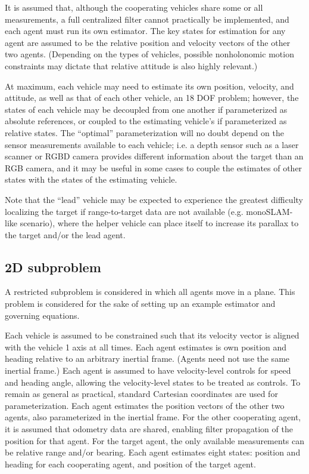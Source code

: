 \documentclass{aiaa-tc}
\begin{document}
It is assumed that, although the cooperating vehicles share some or all measurements, a full centralized filter cannot practically be implemented, and each agent must run its own estimator. The key states for estimation for any agent are assumed to be the relative position and velocity vectors of the other two agents. (Depending on the types of vehicles, possible nonholonomic motion constraints may dictate that relative attitude is also highly relevant.) 

At maximum, each vehicle may need to estimate its own position, velocity, and attitude, as well as that of each other vehicle, an 18 DOF problem; however, the states of each vehicle may be decoupled from one another if parameterized as absolute references, or coupled to the estimating vehicle's if parameterized as relative states. The ``optimal'' parameterization will no doubt depend on the sensor measurements available to each vehicle; i.e. a depth sensor such as a laser scanner or RGBD camera provides different information about the target than an RGB camera, and it may be useful in some cases to couple the estimates of other states with the states of the estimating vehicle.

Note that the ``lead'' vehicle may be expected to experience the greatest difficulty localizing the target if range-to-target data are not available (e.g. monoSLAM-like scenario), where the helper vehicle can place itself to increase its parallax to the target and/or the lead agent.

\subsection{2D subproblem}

A restricted subproblem is considered in which all agents move in a plane. This problem is considered for the sake of setting up an example estimator and governing equations.

Each vehicle is assumed to be constrained such that its velocity vector is aligned with the vehicle 1 axis at all times. Each agent estimates is own position and heading relative to an arbitrary inertial frame. (Agents need not use the same inertial frame.) Each agent is assumed to have velocity-level controls for speed and heading angle, allowing the velocity-level states to be treated as controls. To remain as general as practical, standard Cartesian coordinates are used for parameterization. Each agent estimates the position vectors of the other two agents, also parameterized in the inertial frame. For the other cooperating agent, it is assumed that odometry data are shared, enabling filter propagation of the position for that agent. For the target agent, the only available measurements can be relative range and/or bearing. Each agent estimates eight states: position and heading for each cooperating agent, and position of the target agent.
\end{document}
